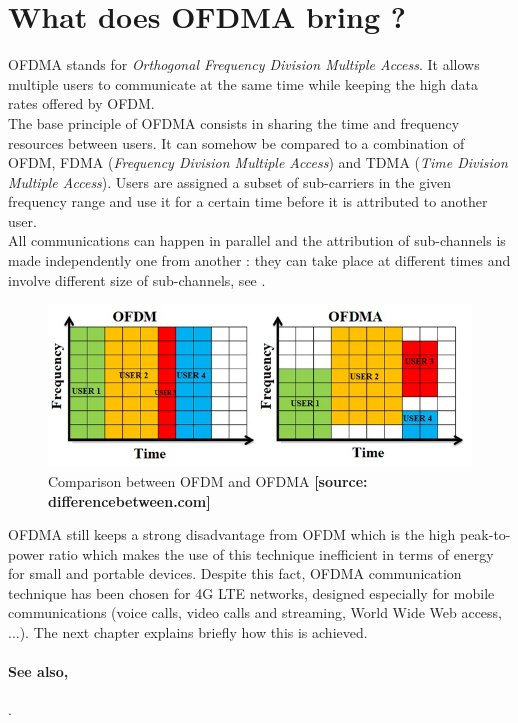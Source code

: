 \section{What does OFDMA bring ?}
%
\indent OFDMA stands for \textit{Orthogonal Frequency Division Multiple Access}. It allows multiple users to communicate at the same time while keeping the high data rates offered by OFDM.\\
%
\indent The base principle of OFDMA consists in sharing the time and frequency resources between users. It can somehow be compared to a combination of OFDM, FDMA (\textit{Frequency Division Multiple Access}) and TDMA (\textit{Time Division Multiple Access})\cite{WikiOFDMA}. Users are assigned a subset of sub-carriers in the given frequency range and use it for a certain time before it is attributed to another user.\\
\indent All communications can happen in parallel and the attribution of sub-channels is made independently one from another : they can take place at different times and involve different size of sub-channels, see .\\
%
\begin{figure}[H]
  \centering
  \includegraphics[width=\textwidth]{figures/difference-between-ofdm-and-ofdma.jpg}
  \caption{Comparison between OFDM and OFDMA \textbf{[source: differencebetween.com]}}
  \label{fig:OFDMvsOFDMA}
\end{figure}
%
\indent OFDMA still keeps a strong disadvantage from OFDM which is the high peak-to-power ratio which makes the use of this technique inefficient in terms of energy for small and portable devices. Despite this fact, OFDMA communication technique has been chosen for 4G LTE networks, designed especially for mobile communications (voice calls, video calls and streaming, World Wide Web access, ...). The next chapter explains briefly how this is achieved.

\paragraph*{See also,}
\cite[Chap.~19]{AMolisch}.